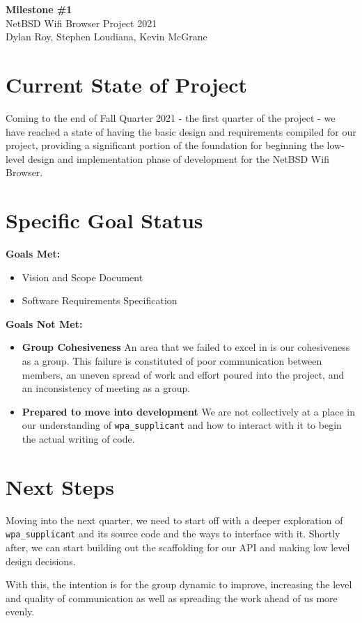 \documentclass[11pt]{article}
\begin{document}
\begin{center}
  \textbf{\Large Milestone \#1}\\\large NetBSD Wifi Browser Project 2021\\
  Dylan Roy, Stephen Loudiana, Kevin McGrane
\end{center}

\section{Current State of Project}
Coming to the end of Fall Quarter 2021 - the first quarter of the project - we have reached a
state of having the basic design and requirements compiled for our project, providing a
significant portion of the foundation for beginning the low-level design and implementation phase of
development for the NetBSD Wifi Browser. 

\section{Specific Goal Status}
\textbf{Goals Met:}
\begin{itemize}
  \item Vision and Scope Document
  \item Software Requirements Specification
\end{itemize}

\textbf{Goals Not Met:}
\begin{itemize}
  \item\textbf{Group Cohesiveness} An area that we failed to excel in is our cohesiveness as
    a group. This failure is constituted of poor communication between members, an uneven
    spread of work and effort poured into the project, and an inconsistency of meeting as a
    group.
  \item\textbf{Prepared to move into development} We are not collectively at a place in our
    understanding of \texttt{wpa\_supplicant} and how to interact with it to begin the actual
    writing of code.
\end{itemize}

\section{Next Steps}
Moving into the next quarter, we need to start off with a deeper exploration of \texttt{wpa\_supplicant}
and its source code and the ways to interface with it. Shortly after, we can start building out the 
scaffolding for our API and making low level design decisions.

With this, the intention is for the group dynamic to improve, increasing the level and quality
of communication as well as spreading the work ahead of us more evenly.
\end{document}
